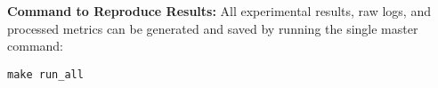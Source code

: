 \documentclass[11pt, a4paper]{article}
\begin{document}
\noindent\textbf{Command to Reproduce Results:} All experimental results, raw logs, and processed metrics can be generated and saved by running the single master command:

\begin{verbatim}
make run_all
\end{verbatim}
\end{document}

